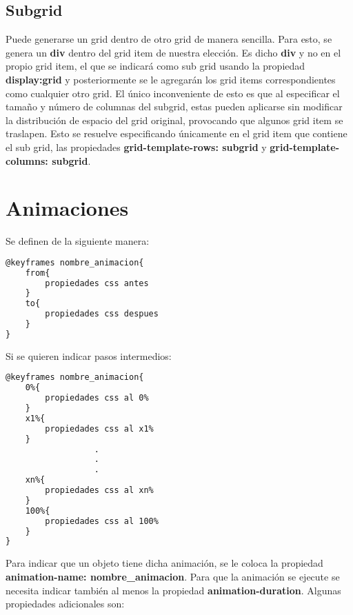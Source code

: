 \documentclass[10pt,oneside]{article}
\begin{document}
\begin{multicols}{2}
\subsection{Subgrid}
    Puede generarse un grid dentro de otro grid de manera sencilla. Para esto, se genera un \textbf{div} dentro del grid item de nuestra elección. Es dicho \textbf{div} y no en el propio grid item,  el que se indicará como sub grid usando la propiedad \textbf{display:grid} y posteriormente se le agregarán los grid items correspondientes como cualquier otro grid. El único inconveniente de esto es que al especificar el tamaño y número de columnas del subgrid, estas pueden aplicarse sin modificar la distribución de espacio del grid original, provocando que algunos grid item se traslapen. Esto se resuelve especificando únicamente en el grid item que contiene el sub grid, las propiedades \textbf{grid-template-rows: subgrid} y \textbf{grid-template-columns: subgrid}.

\section{Animaciones}

    Se definen de la siguiente manera:
    \begin{lstlisting}[language=HTML]
@keyframes nombre_animacion{
    from{
        propiedades css antes
    }
    to{
        propiedades css despues   
    }
}
    \end{lstlisting}
    Si se quieren indicar pasos intermedios:
    \begin{lstlisting}[language=HTML]
@keyframes nombre_animacion{
    0%{
        propiedades css al 0%
    }
    x1%{
        propiedades css al x1%  
    }           
                  .
                  .
                  .
    xn%{
        propiedades css al xn%  
    }
    100%{
        propiedades css al 100%  
    }
}
    \end{lstlisting} 

    Para indicar que un objeto tiene dicha animación, se le coloca la propiedad \textbf{animation-name: nombre\_animacion}. Para que la animación se ejecute se necesita indicar también al menos la propiedad \textbf{animation-duration}. Algunas propiedades adicionales son:


\end{multicols}
\end{document}
